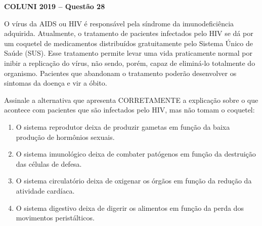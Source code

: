 \textbf{COLUNI 2019 -- Questão 28}\par\medskip O vírus da AIDS ou HIV é responsável pela síndrome da imunodeficiência adquirida. Atualmente, o tratamento de pacientes infectados pelo HIV se dá por um coquetel de medicamentos distribuídos gratuitamente pelo Sistema Único de Saúde (SUS). Esse tratamento permite levar uma vida praticamente normal por inibir a replicação do vírus, não sendo, porém, capaz de eliminá-lo totalmente do organismo. Pacientes que abandonam o tratamento poderão desenvolver os sintomas da doença e vir a óbito.

\par

Assinale a alternativa que apresenta CORRETAMENTE a explicação sobre o que acontece com pacientes que são infectados pelo HIV, mas não tomam o coquetel:\begin{enumerate}
\item O sistema reprodutor deixa de produzir gametas em função da baixa produção de hormônios sexuais.
\item O sistema imunológico deixa de combater patógenos em função da destruição das células de defesa.
\item O sistema circulatório deixa de oxigenar os órgãos em função da redução da atividade cardíaca.
\item O sistema digestivo deixa de digerir os alimentos em função da perda dos movimentos peristálticos.\end{enumerate}

